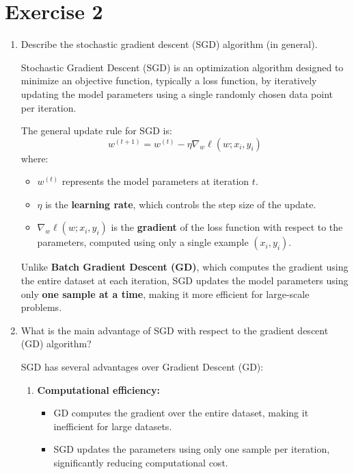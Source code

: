 \documentclass[a4paper,11pt,oneside]{book}
\begin{document}
    \section{Exercise 2}
    \begin{enumerate}
        \item Describe the stochastic gradient descent (SGD) algorithm (in general).
            \begin{solution}
                Stochastic Gradient Descent (SGD) is an optimization algorithm designed to minimize an objective function, typically a loss function, by iteratively updating the model parameters using a single randomly chosen data point per iteration.
                
                The general update rule for SGD is:
                \[
                w^{(t+1)} = w^{(t)} - \eta \nabla_w \ell(w; x_i, y_i)
                \]
                where:
                \begin{itemize}
                    \item $w^{(t)}$ represents the model parameters at iteration $t$.
                    \item $\eta$ is the \textbf{learning rate}, which controls the step size of the update.
                    \item $\nabla_w \ell(w; x_i, y_i)$ is the \textbf{gradient} of the loss function with respect to the parameters, computed using only a single example $(x_i, y_i)$.
                \end{itemize}
                Unlike \textbf{Batch Gradient Descent (GD)}, which computes the gradient using the entire dataset at each iteration, SGD updates the model parameters using only \textbf{one sample at a time}, making it more efficient for large-scale problems.
            \end{solution}
        \clearpage
        \item What is the main advantage of SGD with respect to the gradient descent (GD) algorithm?
            \begin{solution}
                SGD has several advantages over Gradient Descent (GD):
                
                \begin{enumerate}
                    \item \textbf{Computational efficiency:}
                    \begin{itemize}
                        \item GD computes the gradient over the entire dataset, making it inefficient for large datasets.
                        \item SGD updates the parameters using only one sample per iteration, significantly reducing computational cost.
                    \end{itemize}
                

\end{enumerate}
\end{solution}
\end{enumerate}
\end{document}
